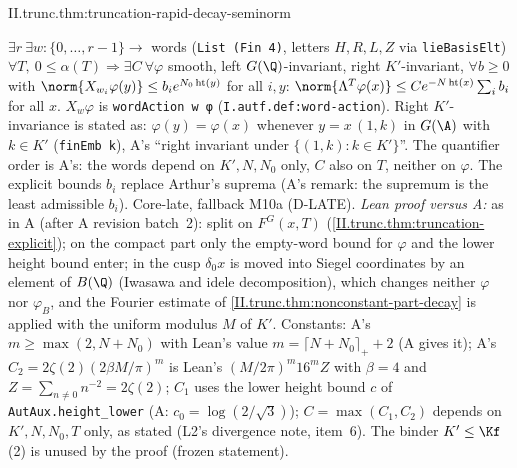 \begin{theorem}[rapid decay, seminorm form]
X.topgrp.def:restricted-product-measurable-space, X.topgrp.lem:restricted-product-borel-space}
\end{theorem}
\begin{tfformal}{II.trunc.thm:truncation-rapid-decay-seminorm}
\begin{tffidelity}
$\exists r\ \exists w\colon\{0,\dots,r-1\}\to$ words (\texttt{List (Fin 4)}, letters $H,R,L,Z$ via \texttt{lieBasisElt}) $\forall T,\ 0\le\alpha(T)\Rightarrow\exists C\ \forall\varphi$ smooth, left $G(\Q)$-invariant, right $K'$-invariant, $\forall b\ge0$ with $\norm{X_{w_i}\varphi(y)}\le b_ie^{N_0\operatorname{ht}(y)}$ for all $i,y$: $\norm{\Lambda^T\varphi(x)}\le Ce^{-N\operatorname{ht}(x)}\sum_ib_i$ for all $x$. $X_w\varphi$ is \texttt{wordAction w φ} (\texttt{I.autf.def:word-action}). Right $K'$-invariance is stated as: $\varphi(y)=\varphi(x)$ whenever $y=x\,(1,k)$ in $G(\A)$ with $k\in K'$ (\texttt{finEmb k}), A's ``right invariant under $\{(1,k):k\in K'\}$''. The quantifier order is A's: the words depend on $K',N,N_0$ only, $C$ also on $T$, neither on $\varphi$. The explicit bounds $b_i$ replace Arthur's suprema (A's remark: the supremum is the least admissible $b_i$). Core-late, fallback M10a (D-LATE). \emph{Lean proof versus A:} as in A (after A revision batch~2): split on $F^G(x,T)$ (\cref{II.trunc.thm:truncation-explicit}); on the compact part only the empty-word bound for $\varphi$ and the lower height bound enter; in the cusp $\delta_0x$ is moved into Siegel coordinates by an element of $B(\Q)$ (Iwasawa and idele decomposition), which changes neither $\varphi$ nor $\varphi_B$, and the Fourier estimate of \cref{II.trunc.thm:nonconstant-part-decay} is applied with the uniform modulus $M$ of $K'$. Constants: A's $m\ge\max(2,N+N_0)$ with Lean's value $m=\lceil N+N_0\rceil_++2$ (A gives it); A's $C_2=2\zeta(2)(2\beta M/\pi)^m$ is Lean's $(M/2\pi)^m16^mZ$ with $\beta=4$ and $Z=\sum_{n\ne0}n^{-2}=2\zeta(2)$; $C_1$ uses the lower height bound $c$ of \texttt{AutAux.height\_lower} (A: $c_0=\log(2/\sqrt3)$); $C=\max(C_1,C_2)$ depends on $K',N,N_0,T$ only, as stated (L2's divergence note, item~6). The binder $K'\le\Kf$ (2) is unused by the proof (frozen statement).
\end{tffidelity}
\end{tfformal}
